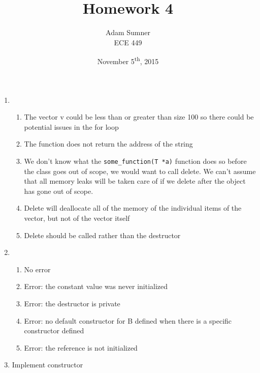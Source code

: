 \documentclass[12pt]{article}
\title{\textbf{Homework 4}}
\author{Adam Sumner \\ ECE 449}
\date{November 5\textsuperscript{th}, 2015}
\begin{document}
\maketitle

\begin{enumerate}
	\item 
	\begin{enumerate}
		\item The vector v could be less than or greater than size 100 so there could be potential issues in the for loop
		\item The function does not return the address of the string
		\item We don't know what the \texttt{some\_function(T *a)} function does so before the class goes out of scope, we would want to call delete. We can't assume that all memory leaks will be taken care of if we delete after the object has gone out of scope.
		\item Delete will deallocate all of the memory of the individual items of the vector, but not of the vector itself
		\item Delete should be called rather than the destructor
	\end{enumerate}
	\item
	\begin{enumerate}
		\item No error
		\item Error: the constant value was never initialized
		\item Error: the destructor is private
		\item Error: no default constructor for B defined when there is a specific constructor defined
		\item Error: the reference is not initialized
	\end{enumerate} 
	\item Implement constructor
\end{enumerate}
\end{document}
